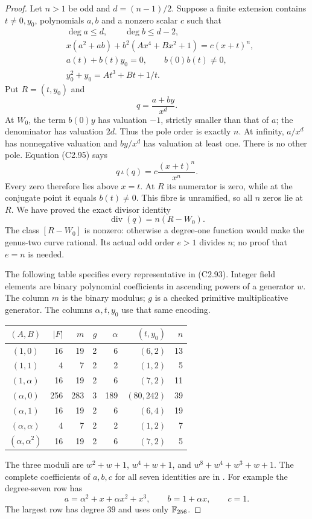 \begin{proof}
Let $n>1$ be odd and $d=(n-1)/2$.
Suppose a finite extension contains
$t\ne0,y_0$, polynomials $a,b$ and a
nonzero scalar $c$ such that
\[
 \begin{aligned}
 &\deg a\le d,\qquad \deg b\le d-2,\\
 &x(a^2+ab)+b^2(Ax^4+Bx^2+1)=c(x+t)^n,\\
 &a(t)+b(t)y_0=0,\qquad b(0)b(t)\ne0,\\
 &y_0^2+y_0=At^3+Bt+1/t.
 \end{aligned}                                             \tag{C2.95}
\]
Put $R=(t,y_0)$ and
\[
                            q=\frac{a+by}{x^d}.
\]
At $W_0$, the term $b(0)y$ has valuation
$-1$, strictly smaller than that of $a$;
the denominator has valuation $2d$.
Thus the pole order is exactly $n$.
At infinity, $a/x^d$ has nonnegative
valuation and $by/x^d$ has valuation at
least one. There is no other pole.
Equation (C2.95) says
\[
                  q\,\iota(q)=c\frac{(x+t)^n}{x^n}.
\]
Every zero therefore lies above $x=t$.
At $R$ its numerator is zero, while at
the conjugate point it equals $b(t)\ne0$.
This fibre is unramified, so all $n$
zeros lie at $R$. We have proved the
exact divisor identity
\[
                      \operatorname{div}(q)=n(R-W_0).      \tag{C2.96}
\]
The class $[R-W_0]$ is nonzero: otherwise
a degree-one function would make the
genus-two curve rational. Its actual odd
order $e>1$ divides $n$; no proof that
$e=n$ is needed.

The following table specifies every
representative in (C2.93). Integer field
elements are binary polynomial coefficients
in ascending powers of a generator $w$.
The column $m$ is the binary modulus;
$g$ is a checked primitive multiplicative
generator. The columns $\alpha,t,y_0$
use that same encoding.
\begin{center}
\begin{tabular}{crrrrrr}
\toprule
$(A,B)$&$|F|$&$m$&$g$&$\alpha$&$(t,y_0)$&$n$\\
\midrule
$(1,0)$&16&19&2&6&$(6,2)$&13\\
$(1,1)$&4&7&2&2&$(1,2)$&5\\
$(1,\alpha)$&16&19&2&6&$(7,2)$&11\\
$(\alpha,0)$&256&283&3&189&$(80,242)$&39\\
$(\alpha,1)$&16&19&2&6&$(6,4)$&19\\
$(\alpha,\alpha)$&4&7&2&2&$(1,2)$&7\\
$(\alpha,\alpha^2)$&16&19&2&6&$(7,2)$&5\\
\bottomrule
\end{tabular}
\end{center}
The three moduli are
$w^2+w+1$, $w^4+w+1$, and
$w^8+w^4+w^3+w+1$.
The complete coefficients of $a,b,c$
for all seven identities are in
.
For example the degree-seven row has
\[
 a=\alpha^2+x+\alpha x^2+x^3,
 \qquad b=1+\alpha x,
 \qquad c=1.
\]
The largest row has degree $39$ and
uses only $\mathbb F_{256}$.


\end{proof}
